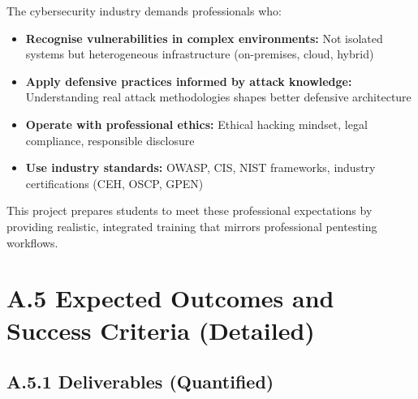 The cybersecurity industry demands professionals who:

\begin{itemize}
    \item \textbf{Recognise vulnerabilities in complex environments:} Not isolated systems but heterogeneous infrastructure (on-premises, cloud, hybrid)
    \item \textbf{Apply defensive practices informed by attack knowledge:} Understanding real attack methodologies shapes better defensive architecture
    \item \textbf{Operate with professional ethics:} Ethical hacking mindset, legal compliance, responsible disclosure
    \item \textbf{Use industry standards:} OWASP, CIS, NIST frameworks, industry certifications (CEH, OSCP, GPEN)
\end{itemize}

This project prepares students to meet these professional expectations by providing realistic, integrated training that mirrors professional pentesting workflows.


\section*{A.5 Expected Outcomes and Success Criteria (Detailed)}


\subsection*{A.5.1 Deliverables (Quantified)}


